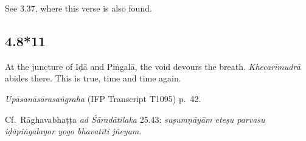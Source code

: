 \begin{ekdosis}




\begin{philcomm}[hp04_008_10]
See 3.37, where this verse is also found.
\end{philcomm}

\subsection*{4.8*11}
\begin{translation}[hp04_008_11]
At the juncture of Iḍā and Piṅgalā, the void devours the breath. \emph{Khecarīmudrā} abides there. This is true, time and time again.
\end{translation}


\begin{testimonia}[hp04_008_11]
\emph{Upāsanāsārasaṅgraha} (IFP Transcript T1095) p.~42.
\begin{versinnote}
\end{versinnote}
\end{testimonia}

\begin{philcomm}[hp04_008_11]
Cf.~Rāghavabhaṭṭa \emph{ad Śāradātilaka} 25.43: \emph{suṣumṇāyām eteṣu parvasu iḍāpiṅgalayor yogo bhavatīti jñeyam}.
\end{philcomm}


\end{ekdosis}
